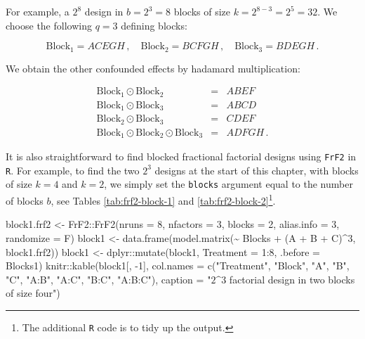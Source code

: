 \documentclass[
]{book}
\newenvironment{Shaded}{\begin{snugshade}}{\end{snugshade}}
\newcommand{\AttributeTok}[1]{\textcolor[rgb]{0.77,0.63,0.00}{#1}}
\newcommand{\DecValTok}[1]{\textcolor[rgb]{0.00,0.00,0.81}{#1}}
\newcommand{\FunctionTok}[1]{\textcolor[rgb]{0.00,0.00,0.00}{#1}}
\newcommand{\NormalTok}[1]{#1}
\newcommand{\OtherTok}[1]{\textcolor[rgb]{0.56,0.35,0.01}{#1}}
\newcommand{\SpecialCharTok}[1]{\textcolor[rgb]{0.00,0.00,0.00}{#1}}
\newcommand{\StringTok}[1]{\textcolor[rgb]{0.31,0.60,0.02}{#1}}
\theoremstyle{definition}
\theoremstyle{definition}
\theoremstyle{definition}
\theoremstyle{definition}
\theoremstyle{remark}
\begin{document}
For example, a \(2^{8}\) design in \(b = 2^{3}=8\) blocks of size \(k = 2^{8-3}=2^{5}=32\). We choose the following \(q=3\) defining blocks:

\[
\mathrm{Block}_{1}=ACEGH\,,\quad \mathrm{Block}_{2}=BCFGH\,,\quad \mathrm{Block}_{3}= BDEGH\,.
\]

We obtain the other confounded effects by hadamard multiplication:

\begin{eqnarray}
\mathrm{Block}_{1}\odot \mathrm{Block}_{2} & = & ABEF \nonumber\\
\mathrm{Block}_{1}\odot \mathrm{Block}_{3} & = & ABCD \nonumber\\
\mathrm{Block}_{2}\odot \mathrm{Block}_{3} & = & CDEF \nonumber\\
\mathrm{Block}_{1}\odot \mathrm{Block}_{2} \odot \mathrm{Block}_{3} & = & ADFGH\,. \nonumber
\end{eqnarray}

It is also straightforward to find blocked fractional factorial designs using \texttt{FrF2} in \texttt{R}. For example, to find the two \(2^3\) designs at the start of this chapter, with blocks of size \(k=4\) and \(k=2\), we simply set the \texttt{blocks} argument equal to the number of blocks \(b\), see Tables \ref{tab:frf2-block-1} and \ref{tab:frf2-block-2}\footnote{The additional \texttt{R} code is to tidy up the output.}.

\begin{Shaded}
\begin{Highlighting}[]
\NormalTok{block1.frf2 }\OtherTok{\textless{}{-}}\NormalTok{ FrF2}\SpecialCharTok{::}\FunctionTok{FrF2}\NormalTok{(}\AttributeTok{nruns =} \DecValTok{8}\NormalTok{, }\AttributeTok{nfactors =} \DecValTok{3}\NormalTok{, }\AttributeTok{blocks =} \DecValTok{2}\NormalTok{, }
                          \AttributeTok{alias.info =} \DecValTok{3}\NormalTok{, }\AttributeTok{randomize =}\NormalTok{ F)}
\NormalTok{block1 }\OtherTok{\textless{}{-}} \FunctionTok{data.frame}\NormalTok{(}\FunctionTok{model.matrix}\NormalTok{(}\SpecialCharTok{\textasciitilde{}}\NormalTok{ Blocks }\SpecialCharTok{+}\NormalTok{ (A }\SpecialCharTok{+}\NormalTok{ B }\SpecialCharTok{+}\NormalTok{ C)}\SpecialCharTok{\^{}}\DecValTok{3}\NormalTok{, block1.frf2))}
\NormalTok{block1 }\OtherTok{\textless{}{-}}\NormalTok{ dplyr}\SpecialCharTok{::}\FunctionTok{mutate}\NormalTok{(block1, }\AttributeTok{Treatment =} \DecValTok{1}\SpecialCharTok{:}\DecValTok{8}\NormalTok{, }\AttributeTok{.before =}\NormalTok{ Blocks1)}
\NormalTok{knitr}\SpecialCharTok{::}\FunctionTok{kable}\NormalTok{(block1[, }\SpecialCharTok{{-}}\DecValTok{1}\NormalTok{], }\AttributeTok{col.names =} \FunctionTok{c}\NormalTok{(}\StringTok{"Treatment"}\NormalTok{, }\StringTok{"Block"}\NormalTok{, }\StringTok{"A"}\NormalTok{, }\StringTok{"B"}\NormalTok{, }\StringTok{"C"}\NormalTok{, }
                                         \StringTok{"A:B"}\NormalTok{, }\StringTok{"A:C"}\NormalTok{, }\StringTok{"B:C"}\NormalTok{, }\StringTok{"A:B:C"}\NormalTok{),}
             \AttributeTok{caption =} \StringTok{"$2\^{}3$ factorial design in two blocks of size four"}\NormalTok{)}
\end{Highlighting}
\end{Shaded}
\end{document}
